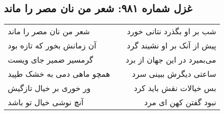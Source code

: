 \begin{center}
\section*{غزل شماره ۹۸۱: شعر من نان مصر را ماند}
\label{sec:0981}
\begin{longtable}{l p{0.5cm} r}
شعر من نان مصر را ماند
&&
شب بر او بگذرد نتانی خورد
\\
آن زمانش بخور که تازه بود
&&
پیش از آنک بر او نشیند گرد
\\
گرمسیر ضمیر جای ویست
&&
می‌بمیرد در این جهان از برد
\\
همچو ماهی دمی به خشک طپید
&&
ساعتی دیگرش ببینی سرد
\\
ور خوری بر خیال تازگیش
&&
بس خیالات نقش باید کرد
\\
آنچ نوشی خیال تو باشد
&&
نبود گفتن کهن ای مرد
\\
\end{longtable}
\end{center}
